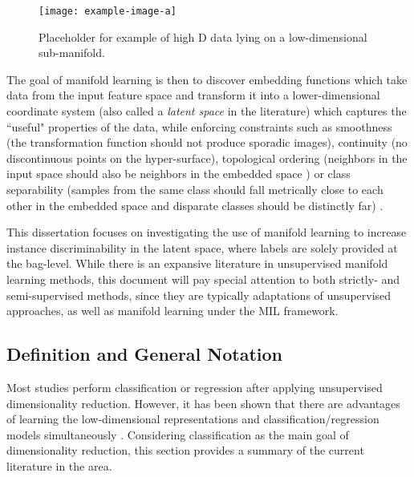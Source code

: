\begin{center}
	\begin{figure*}[h]
		\centering
		\texttt{[image: example-image-a]}
		\caption[Example pose data manifold.]{Placeholder for example of high D data lying on a low-dimensional sub-manifold.}
		\label{fig:manifold_eg}
	\end{figure*}
\end{center}

The goal of manifold learning is then to discover embedding functions which take data from the input feature space and transform it into a lower-dimensional coordinate system (also called a \textit{latent space} in the literature) which captures the ``useful" properties of the data, while enforcing constraints such as smoothness (the transformation function should not produce sporadic images), continuity (no discontinuous points on the hyper-surface), topological ordering (neighbors in the input space should also be neighbors in the embedded space ) or class separability (samples from the same class should fall metrically close to each other in the embedded space and disparate classes should be distinctly far) \citep{Vural2018StudySupervisedManifoldLearning}.

This dissertation focuses on investigating the use of manifold learning to increase instance discriminability in the latent space, where labels are solely provided at the bag-level.   While there is an expansive literature in unsupervised manifold learning methods, this document will pay special attention to both strictly- and semi-supervised methods, since they are typically adaptations of unsupervised approaches, as well as manifold learning under the MIL framework.

\subsection{Definition and General Notation}
Most studies perform classification or regression after applying unsupervised dimensionality reduction.  However, it has been shown that there are advantages of learning the low-dimensional representations and classification/regression models simultaneously \citep{Chao2019RecentAdvancesSupervisedDimRed,Rish2008SupDimRedGLM}.  Considering classification as the main goal of dimensionality reduction, this section provides a summary of the current literature in the area. \newline

